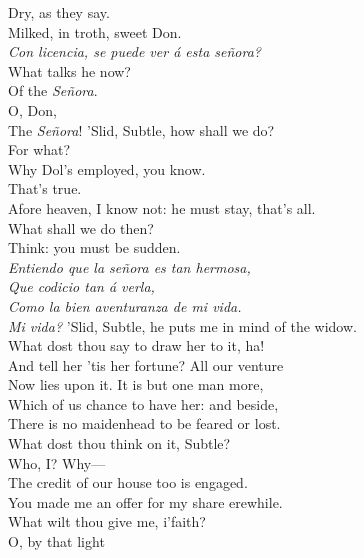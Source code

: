 \documentclass[a4paper,oneside,12pt]{memoir}
\begin{document}
\begin{drama*}
Dry, as they say.\\
\facespeaks {} Milked, in troth, sweet Don.\\
\surlyspeaks \emph{Con licencia, se puede ver \'{a} esta se\~{n}ora?}\\
\subtlespeaks What talks he now?\\
\facespeaks {} Of the \emph{Se\~{n}ora}.\\
\subtlespeaks {} O, Don,\\
The \emph{Se\~{n}ora}!
\facespeaks {} 'Slid, Subtle, how shall we do?\\
\subtlespeaks For what?\\
\facespeaks {} Why Dol's employed, you know.\\
\subtlespeaks {} That's true.\\
Afore heaven, I know not: he must stay, that's all.\\
\subtlespeaks What shall we do then?\\
\facespeaks {} Think: you must be sudden.\\
\surlyspeaks \emph{Entiendo que la se\~{n}ora es tan hermosa,\\
Que codicio tan \'{a} verla,\\
Como la bien aventuranza de mi vida.}\\
\facespeaks \emph{Mi vida?} 'Slid, Subtle, he puts me in mind of the widow.\\
What dost thou say to draw her to it, ha!\\
And tell her 'tis her fortune? All our venture\\
Now lies upon it. It is but one man more,\\
Which of us chance to have her: and beside,\\
There is no maidenhead to be feared or lost.\\
What dost thou think on it, Subtle?\\
\subtlespeaks {} Who, I? Why---\\
\facespeaks The credit of our house too is engaged.\\
\subtlespeaks You made me an offer for my share erewhile.\\
What wilt thou give me, i'faith?\\
\facespeaks {} O, by that light\\

\end{drama*}
\end{document}
